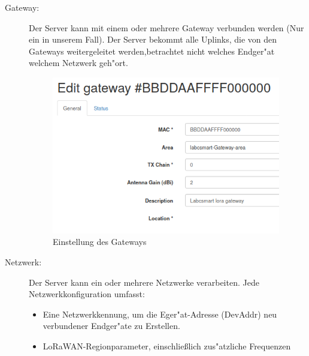 \begin{description}
	\item[Gateway:] Der Server kann mit einem oder mehrere Gateway verbunden werden (Nur ein in unserem Fall). Der Server bekommt alle Uplinks, die von den Gateways weitergeleitet werden,betrachtet nicht welches Endger"at welchem Netzwerk geh"ort.
	
	\begin{figure}[h]
		\centering
		\includegraphics[width=10cm]{source/images/Gateway}
		\caption{Einstellung des Gateways\label{fig:gateway}}
	\end{figure}

	\item[Netzwerk:] Der Server kann ein oder mehrere Netzwerke verarbeiten. Jede Netzwerkkonfiguration umfasst:
	\begin{itemize}
		\item Eine Netzwerkkennung, um die Eger"at-Adresse (DevAddr) neu verbundener Endger"ate zu Erstellen.
		\item LoRaWAN-Regionparameter, einschlie\ss{}lich zus"atzliche Frequenzen
	\end{itemize}


\end{description}
